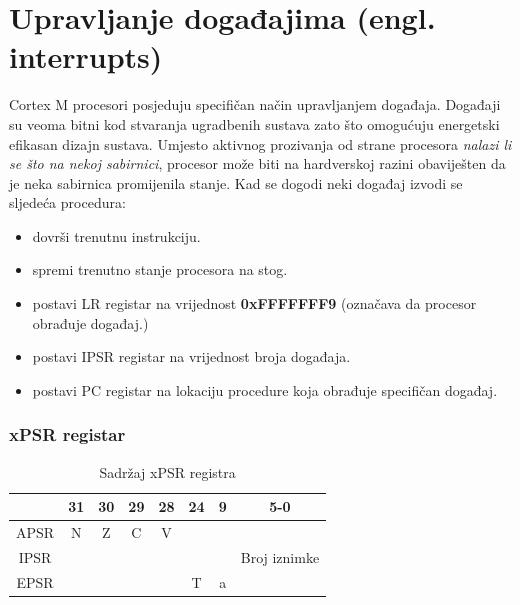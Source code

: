 \documentclass[times, utf8, diplomski]{diplomski}
\begin{document}
\newpage

\section{Upravljanje događajima (engl. interrupts)}
Cortex M procesori posjeduju specifičan način upravljanjem događaja. Događaji su veoma bitni kod stvaranja ugradbenih sustava zato što omogućuju energetski efikasan dizajn sustava.
Umjesto aktivnog prozivanja od strane procesora \textit{nalazi li se što na nekoj sabirnici}, procesor može biti na hardverskoj razini obaviješten da je neka sabirnica promijenila stanje.
Kad se dogodi neki događaj izvodi se sljedeća procedura:

\begin{itemize}
  \item dovrši trenutnu instrukciju.
  \item spremi trenutno stanje procesora na stog.
  \item postavi LR registar na vrijednost \textbf{0xFFFFFFF9} (označava da procesor obrađuje događaj.)
  \item postavi IPSR registar na vrijednost broja događaja.
  \item postavi PC registar na lokaciju procedure koja obrađuje specifičan događaj.
\end{itemize}

\subsubsection{xPSR registar}

\begin{table}[H]
  \begin{center}
    \begin{tabular}{c|c|c|c|c||c||c||c|}
      \cline{2-8} & 31 & 30 & 29 & 28 & 24 & 9 & 5-0\\
      \hline
      \multicolumn{1}{|c|}{APSR} & N & Z & C & V & \multicolumn{3}{c|}{ } \\
      \hline
      \multicolumn{1}{|c|}{IPSR} & \multicolumn{6}{c||}{ } & Broj iznimke \\
      \hline
      \multicolumn{1}{|c|}{EPSR} & \multicolumn{4}{c||}{ } & T & a & \\
      \hline
    \end{tabular}
    \caption{Sadržaj xPSR registra}
  \end{center}
\end{table}

\newpage
\end{document}
